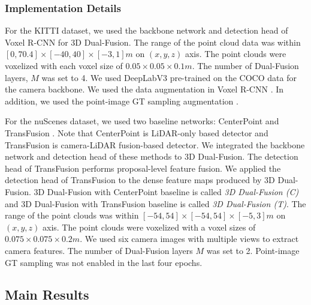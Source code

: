 \documentclass[lettersize,journal]{IEEEtran}
\begin{document}
\subsubsection{Implementation Details}
For the KITTI dataset, we used the backbone network and detection head of  Voxel R-CNN \cite{voxelrcnn} for 3D Dual-Fusion. The range of the point cloud data was within $[0, 70.4]\times[-40, 40]\times[-3, 1]m$ on  $(x, y, z)$ axis. The point clouds were voxelized with each voxel size of $0.05\times0.05\times0.1m$. The number of Dual-Fusion layers, $M$ was set to 4. We used DeepLabV3 \cite{deeplabv3} pre-trained on the COCO data for the camera backbone.
We used the data augmentation in Voxel R-CNN \cite{voxelrcnn}. In addition, we used  the point-image GT sampling augmentation \cite{moca}. 

For the nuScenes dataset, we used two baseline networks: CenterPoint \cite{centerpoint} and  TransFusion \cite{transfusion}. Note that CenterPoint is LiDAR-only based detector and TransFusion is camera-LiDAR fusion-based detector.  We integrated the backbone network and detection head of these methods to 3D Dual-Fusion. The detection head of TransFusion performs proposal-level feature fusion. We applied the detection head of TransFusion to the dense feature maps produced by 3D Dual-Fusion.  3D Dual-Fusion with CenterPoint baseline is called {\it 3D Dual-Fusion (C)} and 3D Dual-Fusion with TransFusion baseline is called {\it 3D Dual-Fusion (T)}. The range of the point clouds was within $[-54, 54]\times[-54, 54]\times[-5, 3]m$ on  $(x,y,z)$ axis. The point clouds were voxelized with a voxel sizes of $0.075\times0.075\times0.2m$. We used six camera images with multiple views to extract camera features. The number of Dual-Fusion layers $M$ was set to 2. Point-image GT sampling was not enabled in the last four epochs. 



\subsection{Main Results}
\end{document}
